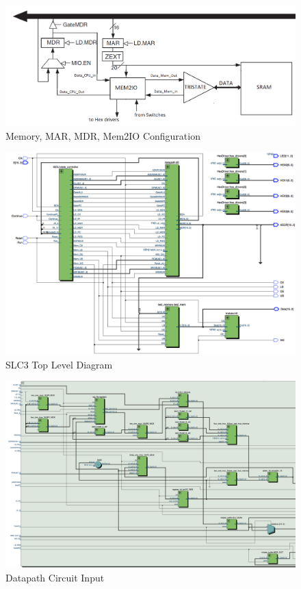\documentclass[journal, twocolumn, final,11pt,letterpaper]{IEEEtran}
\begin{document}
\begin{figure} [htbp]
	\centering
	\includegraphics[scale=0.4]{Memory_Circuit.png}
	\caption{Memory, MAR, MDR, Mem2IO Configuration\label{fig:Memory-Circuit}}
\end{figure}

\begin{figure} [htbp]
	\centering
	\includegraphics[scale=0.4]{slc3_top_level_circuit.png}
	\caption{SLC3 Top Level Diagram\label{fig:slc3-circuit}}
\end{figure}

\begin{figure} [htbp]
	\centering
	\includegraphics[scale=0.4]{datapath_input_circuit.png}
	\caption{Datapath Circuit Input\label{fig:datapath-circuit-input}}
\end{figure}
\end{document}
